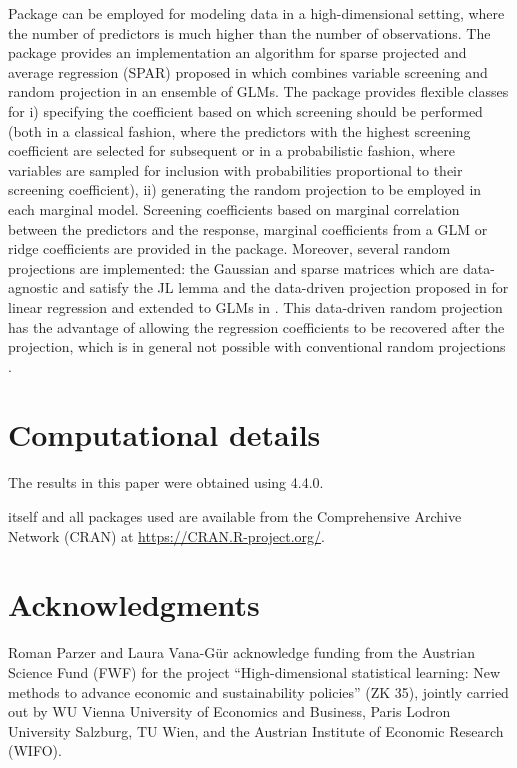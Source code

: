 \documentclass[
  article]{jss}
\begin{document}
Package  can be employed for modeling data in a
high-dimensional setting, where the number of predictors is much higher
than the number of observations. The package provides an implementation
an algorithm for sparse projected and average regression (SPAR) proposed
in \citet{parzer2024glms} which combines variable screening and random
projection in an ensemble of GLMs. The package provides flexible classes
for i) specifying the coefficient based on which screening should be
performed (both in a classical fashion, where the predictors with the
highest screening coefficient are selected for subsequent or in a
probabilistic fashion, where variables are sampled for inclusion with
probabilities proportional to their screening coefficient), ii)
generating the random projection to be employed in each marginal model.
Screening coefficients based on marginal correlation between the
predictors and the response, marginal coefficients from a GLM or ridge
coefficients are provided in the package. Moreover, several random
projections are implemented: the Gaussian and sparse matrices which are
data-agnostic and satisfy the JL lemma and the data-driven projection
proposed in \citet{parzer2024sparse} for linear regression and extended
to GLMs in \citet{parzer2024glms}. This data-driven random projection
has the advantage of allowing the regression coefficients to be
recovered after the projection, which is in general not possible with
conventional random projections \citep{Thanei2017RPforHDR}.

\section*{Computational details}\label{computational-details}

The results in this paper were obtained using  4.4.0.

 itself and all packages used are available from the
Comprehensive  Archive Network (CRAN) at
\url{https://CRAN.R-project.org/}.

\section*{Acknowledgments}\label{acknowledgments}

Roman Parzer and Laura Vana-Gür acknowledge funding from the Austrian
Science Fund (FWF) for the project ``High-dimensional statistical
learning: New methods to advance economic and sustainability policies''
(ZK 35), jointly carried out by WU Vienna University of Economics and
Business, Paris Lodron University Salzburg, TU Wien, and the Austrian
Institute of Economic Research (WIFO).


\renewcommand\refname{References}
  
\end{document}
